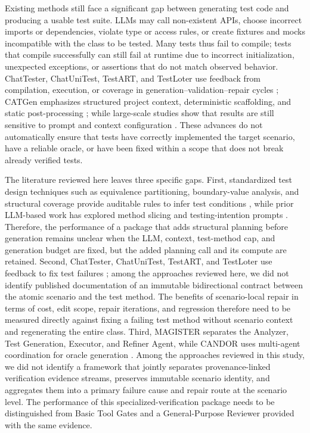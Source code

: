 \documentclass[pdflatex,sn-basic,Numbered,iicol]{sn-jnl}
\begin{document}
Existing methods still face a significant gap between generating test code and producing a usable test suite. LLMs may call non-existent APIs, choose incorrect imports or dependencies, violate type or access rules, or create fixtures and mocks incompatible with the class to be tested. Many tests thus fail to compile; tests that compile successfully can still fail at runtime due to incorrect initialization, unexpected exceptions, or assertions that do not match observed behavior. ChatTester, ChatUniTest, TestART, and TestLoter use feedback from compilation, execution, or coverage in generation--validation--repair cycles \cite{bib26,bib4,bib27,bib28}; CATGen emphasizes structured project context, deterministic scaffolding, and static post-processing \cite{bib29}; while large-scale studies show that results are still sensitive to prompt and context configuration \cite{bib5,bib11}. These advances do not automatically ensure that tests have correctly implemented the target scenario, have a reliable oracle, or have been fixed within a scope that does not break already verified tests.

The literature reviewed here leaves three specific gaps. First, standardized test design techniques such as equivalence partitioning, boundary-value analysis, and structural coverage provide auditable rules to infer test conditions \cite{bib30}, while prior LLM-based work has explored method slicing and testing-intention prompts \cite{bib6,bib7}. Therefore, the performance of a package that adds structural planning before generation remains unclear when the LLM, context, test-method cap, and generation budget are fixed, but the added planning call and its compute are retained. Second, ChatTester, ChatUniTest, TestART, and TestLoter use feedback to fix test failures \cite{bib26,bib4,bib27,bib28}; among the approaches reviewed here, we did not identify published documentation of an immutable bidirectional contract between the atomic scenario and the test method. The benefits of scenario-local repair in terms of cost, edit scope, repair iterations, and regression therefore need to be measured directly against fixing a failing test method without scenario context and regenerating the entire class. Third, MAGISTER separates the Analyzer, Test Generation, Executor, and Refiner Agent, while CANDOR uses multi-agent coordination for oracle generation \cite{bib31,bib22}. Among the approaches reviewed in this study, we did not identify a framework that jointly separates provenance-linked verification evidence streams, preserves immutable scenario identity, and aggregates them into a primary failure cause and repair route at the scenario level. The performance of this specialized-verification package needs to be distinguished from Basic Tool Gates and a General-Purpose Reviewer provided with the same evidence.
\end{document}
